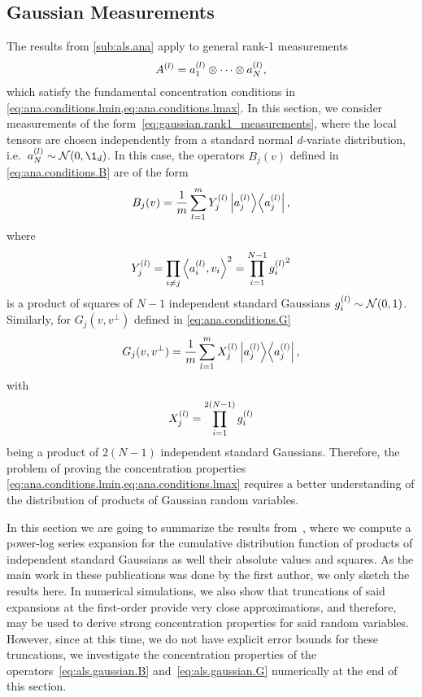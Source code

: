 \subsection{Gaussian Measurements}%
\label{sub:als.gaussian_measurements}

The results from \cref{sub:als.ana} apply to general rank-1 measurements
\[
  A^{(l)} = a^{(l)}_1 \otimes \cdots \otimes a^{(l)}_N,
  \label{eq:gaussian.rank1_measurements}
\]
which satisfy the fundamental concentration conditions in \cref{eq:ana.conditions.lmin,eq:ana.conditions.lmax}.
In this section, we consider measurements of the form~\eqref{eq:gaussian.rank1_measurements}, where the local tensors are chosen independently from a standard normal $d$-variate distribution, i.e.\ $a\ind{l}_N \sim \Normal(0, \1_d)$.
In this case, the operators $B_j(v)$ defined in \cref{eq:ana.conditions.B} are of the form
\[
  \label{eq:als.gaussian.B}
  B_j(v) = \frac{1}{m} \sum_{l=1}^m Y_j^{(l)} \left| a^{(l)}_j \middle\rangle\middle\langle a^{(l)}_j \right|,
\]
where
\[
  Y_j^{(l)} = \prod_{i \neq j} \Braket{a_i^{(l)}, v_i}^2 = \prod_{i = 1}^{N - 1} {g^{(l)}_i}^2
\]
is a product of squares of $N - 1$ independent standard Gaussians $g^{(l)}_i \sim \mathcal{N}(0, 1)$.
Similarly, for $G_j(v, v^\perp)$ defined in \cref{eq:ana.conditions.G}
\[
  \label{eq:als.gaussian.G}
  G_j(v, v^\perp) = \frac{1}{m} \sum_{l=1}^m X_j^{(l)} \left| a^{(l)}_j \middle\rangle\middle\langle a^{(l)}_j \right|,
\]
with
\[
  X_j^{(l)} = \prod_{i = 1}^{2(N - 1)} {g^{(l)}_i}
\]
being a product of $2(N - 1)$ independent standard Gaussians.
Therefore, the problem of proving the concentration properties \cref{eq:ana.conditions.lmin,eq:ana.conditions.lmax} requires a better understanding of the distribution of products of Gaussian random variables.

In this section we are going to summarize the results from~\cite{}, where we compute a power-log series expansion for the cumulative distribution function of products of independent standard Gaussians as well their absolute values and squares.
As the main work in these publications was done by the first author, we only sketch the results here.
In numerical simulations, we also show that truncations of said expansions at the first-order provide very close approximations, and therefore, may be used to derive strong concentration properties for said random variables.
However, since at this time, we do not have explicit error bounds for these truncations, we investigate the concentration properties of the operators~\eqref{eq:als.gaussian.B} and~\eqref{eq:als.gaussian.G} numerically at the end of this section.\\



